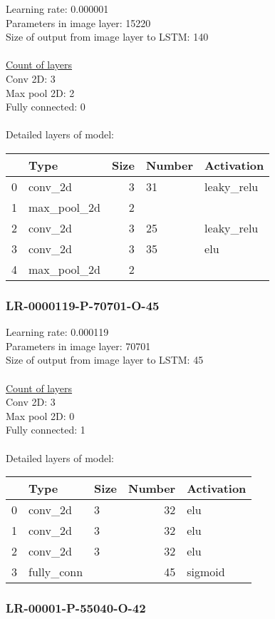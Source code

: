 Learning rate: 0.000001
\\Parameters in image layer: 15220
\\Size of output from image layer to LSTM: 140
\\\\\underline{Count of layers} 
\\Conv 2D:           3\\Max pool 2D:      2\\Fully connected:  0
\\\\Detailed layers of model: \\\begin{tabular}{rlrll}
\hline
    & Type        &   Size & Number   & Activation   \\
\hline
  0 & conv\_2d     &      3 & 31       & leaky\_relu   \\
  1 & max\_pool\_2d &      2 &          &              \\
  2 & conv\_2d     &      3 & 25       & leaky\_relu   \\
  3 & conv\_2d     &      3 & 35       & elu          \\
  4 & max\_pool\_2d &      2 &          &              \\
\hline
\end{tabular}\subsubsection*{LR-0000119-P-70701-O-45}
Learning rate: 0.000119
\\Parameters in image layer: 70701
\\Size of output from image layer to LSTM: 45
\\\\\underline{Count of layers} 
\\Conv 2D:           3\\Max pool 2D:      0\\Fully connected:  1
\\\\Detailed layers of model: \\\begin{tabular}{rllrl}
\hline
    & Type       & Size   &   Number & Activation   \\
\hline
  0 & conv\_2d    & 3      &       32 & elu          \\
  1 & conv\_2d    & 3      &       32 & elu          \\
  2 & conv\_2d    & 3      &       32 & elu          \\
  3 & fully\_conn &        &       45 & sigmoid      \\
\hline
\end{tabular}\subsubsection*{LR-00001-P-55040-O-42}

